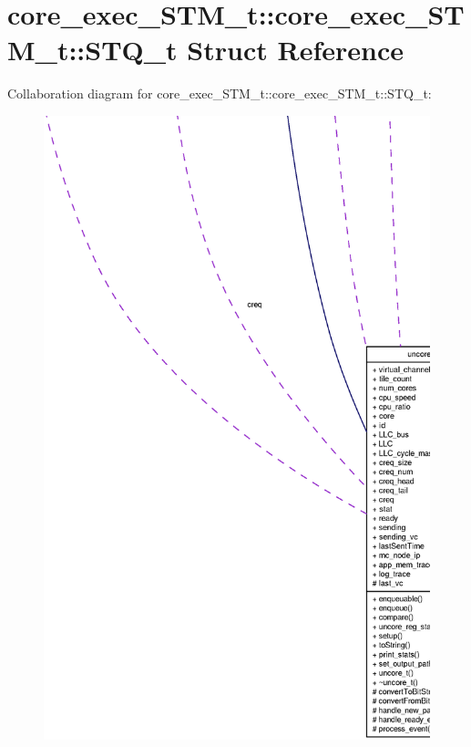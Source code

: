 \section{core\_\-exec\_\-STM\_\-t::core\_\-exec\_\-STM\_\-t::STQ\_\-t Struct Reference}
\label{structcore__exec__STM__t_1_1STQ__t}
Collaboration diagram for core\_\-exec\_\-STM\_\-t::core\_\-exec\_\-STM\_\-t::STQ\_\-t:\nopagebreak
\begin{figure}[H]
\begin{center}
\leavevmode
\includegraphics[width=400pt]{structcore__exec__STM__t_1_1STQ__t__coll__graph}
\end{center}
\end{figure}
